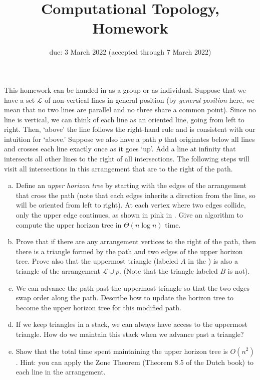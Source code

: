 \documentclass{article}
\title{Computational Topology, Homework \hwnum}
\author{\todo{your name(s) here}}
\date{due: 3 March 2022 (accepted through 7 March 2022)}
\begin{document}
\maketitle




This homework can be handed in as a group or as individual.
Suppose that we have a set $\mathcal{L}$ of non-vertical lines in general position (by
\emph{general position} here, we mean that no two lines are
parallel and no three share a common point).
Since no line is vertical, we can think of each line as an oriented line, going
from left to right.  Then, `above' the line follows the right-hand rule and is
consistent with our intuition for `above.'  Suppose we also have
a path $p$  that originates below all lines and crosses each
line exactly once as it goes `up'.  Add a line at infinity that intersects
all other lines to the right of all intersections.  The following steps will
visit all intersections in this arrangement that are to the right of the path.

\begin{enumerate}[(a)]
    \item Define an \emph{upper horizon tree} by starting with the edges of the
        arrangement that cross the path (note that each edges inherits a
        direction from the line, so will be oriented from left to right). At each vertex where
        two edges collide, only the upper edge continues, as shown in pink in
        . Give an algorithm to
        compute the upper horizon tree in $\Theta(n \log n)$ time.
    \item Prove that if there are any arrangement vertices to the right of the
        path, then there is a triangle formed by the path and two edges of the
        upper horizon tree.  Prove also that the uppermost triangle (labeled
        $A$ in the ) is also a triangle of the arrangement
        $\mathcal{L} \cup p$.  (Note that
        the triangle labeled $B$ is not).
    \item We can advance the path past the uppermost triangle so that the two edges swap
        order along the path.  Describe how to update the horizon tree to become
        the upper horizon tree for this modified path.
    \item If we keep triangles in a stack, we can always have
        access to the uppermost triangle.  How do we maintain this stack when we
        advance past a triangle?
    \item Show that the total time spent maintaining the upper horizon tree is
        $O(n^2)$.  Hint: you can apply the Zone Theorem (Theorem 8.5 of the
        Dutch book) to each line in the arrangement.
\end{enumerate}
\end{document}
